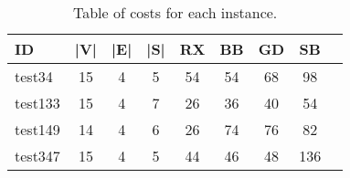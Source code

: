 \begin{table}
\caption{Table of costs for each instance.}
\label{tab:cost_small}
\begin{tabular}{lcccccccc}
\toprule
ID & |V| & |E| & |S| & RX & BB & GD & SB \\
\midrule
test34 & 15 & 4 & 5 & 54 & 54 & 68 & 98 \\
test133 & 15 & 4 & 7 & 26 & 36 & 40 & 54 \\
test149 & 14 & 4 & 6 & 26 & 74 & 76 & 82 \\
test347 & 15 & 4 & 5 & 44 & 46 & 48 & 136 \\
\bottomrule
\end{tabular}
\end{table}
